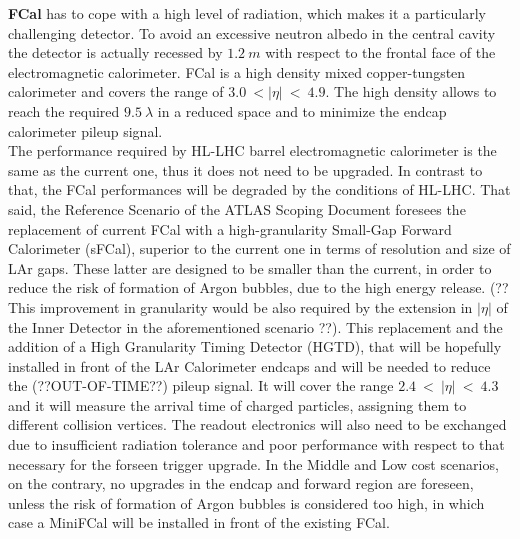 \documentclass[a4paper,12pt]{article}
\begin{document}
\textbf{FCal} has to cope with a high level of radiation, which makes it a particularly challenging detector. To avoid an excessive neutron albedo in the central cavity the detector is actually recessed by 
$1.2\ m$ with respect to the frontal face of the electromagnetic calorimeter. FCal is a high density mixed copper-tungsten calorimeter and covers the range of $3.0\ < |\eta|\ <\ 4.9$.  The high density allows to reach the required $9.5\ \lambda$ in a reduced space and to minimize the endcap calorimeter pileup signal.  \\[2pt]

The performance required by HL-LHC barrel electromagnetic calorimeter is the same as the current one, thus it does not need to be upgraded. In contrast to that, the FCal performances will be degraded by the conditions of HL-LHC. That said, the Reference Scenario of the ATLAS Scoping Document\cite{scoping} foresees the replacement of current FCal with a high-granularity Small-Gap Forward Calorimeter (sFCal), superior to the current one in terms of resolution and size of LAr gaps. These latter are designed to be smaller than the current, in order to reduce the risk of formation of Argon bubbles, due to the high energy release. (?? This improvement in granularity would be also required by the extension in $|\eta|$ of the Inner Detector in the aforementioned scenario ??). This replacement and the addition of a High Granularity Timing Detector (HGTD), that will be hopefully installed in front of the LAr Calorimeter endcaps and will be needed to reduce the (??OUT-OF-TIME??) pileup signal. It will cover the range $2.4\ <\ |\eta|\ <\ 4.3$ and it will measure the arrival time of charged particles, assigning them to different collision vertices. The readout electronics will also need to be exchanged due to insufficient radiation tolerance and poor performance with respect to that necessary for the forseen trigger upgrade. In the Middle and Low cost 
scenarios, on the contrary, no upgrades in the endcap and forward region are foreseen, unless the risk of formation of Argon bubbles is considered too high, in which case a MiniFCal will be installed in front of the existing FCal. 
\end{document}
